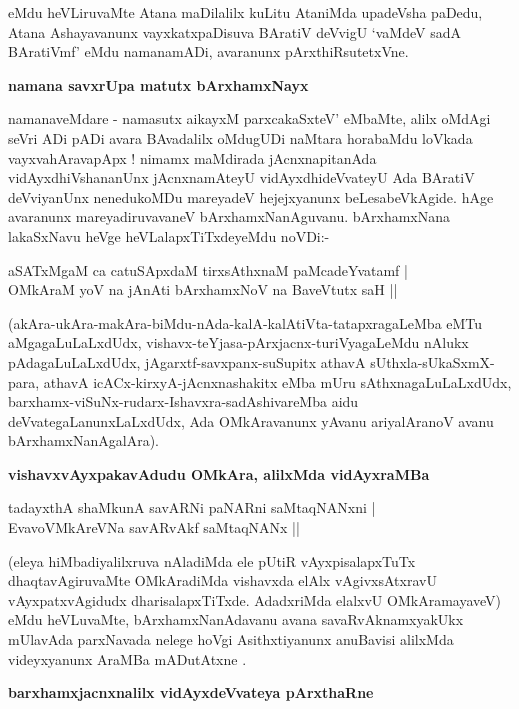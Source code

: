 \noindent
eMdu heVLiruvaMte Atana maDilalilx kuLitu AtaniMda upadeVsha paDedu, Atana Ashayavanunx vayxkatxpaDisuva BAratiV deVvigU `vaMdeV sadA BAratiVmf' eMdu namanamADi, avaranunx pArxthiRsutetxVne.

{\bigskip
\noindent
{\large\bf namana savxrUpa matutx bArxhamxNayx}}\label{page84a}
\medskip

\noindent
namanaveMdare - namasutx aikayxM parxcakaSxteV' eMbaMte, alilx oMdAgi seVri ADi pADi avara BAvadalilx oMdugUDi naMtara horabaMdu loVkada vayxvahAravapApx ! nimamx maMdirada jAcnxnapitanAda vidAyxdhiVshananUnx jAcnxnamAteyU vidAyxdhideVvateyU Ada BAratiV deVviyanUnx nenedukoMDu mareyadeV hejejxyanunx beLesabeVkAgide. hAge avaranunx mareyadiruvavaneV bArxhamxNanAguvanu. bArxhamxNana lakaSxNavu heVge heVLalapxTiTxdeyeMdu noVDi:-

\begin{shloka}
aSATxMgaM ca catuSApxdaM tirxsAthxnaM paMcadeYvatamf |\\\label{84a}
OMkAraM yoV na jAnAti bArxhamxNoV na BaveVtutx saH ||
\end{shloka}

\noindent
(akAra-ukAra-makAra-biMdu-nAda-kalA-kalAtiVta-tatapxragaLeMba eMTu aMgagaLuLaLxdUdx, vishavx-teYjasa-pArxjacnx-turiVyagaLeMdu nAlukx pAdagaLuLaLxdUdx, jAgarxtf-savxpanx-suSupitx athavA sUthxla-sUkaSxmX-para, athavA icACx-kirxyA-jAcnxnashakitx eMba mUru sAthxnagaLuLaLxdUdx, barxhamx-viSuNx-rudarx-Ishavxra-sadAshivareMba aidu deVvategaLanunxLaLxdUdx, Ada OMkAravanunx yAvanu ariyalAranoV avanu bArxhamxNanAgalAra).

{\bigskip
\noindent
{\large\bf vishavxvAyxpakavAdudu OMkAra, alilxMda vidAyxraMBa}}
\medskip

\begin{shloka}
tadayxthA shaMkunA savARNi paNARni saMtaqNANxni |\\\label{84}
EvavoVMkAreVNa savARvAkf saMtaqNANx ||
\end{shloka}

\noindent
(eleya hiMbadiyalilxruva nAladiMda ele pUtiR vAyxpisalapxTuTx dhaqtavAgiruvaMte OMkAradiMda vishavxda elAlx vAgivxsAtxravU vAyxpatxvAgidudx dharisalapxTiTxde. AdadxriMda elalxvU OMkAramayaveV) eMdu heVLuvaMte, bArxhamxNanAdavanu avana savaRvAknamxyakUkx mUlavAda parxNavada nelege hoVgi Asithxtiyanunx anuBavisi alilxMda videyxyanunx AraMBa mADutAtxne .

{\bigskip
\noindent
{\large\bf barxhamxjacnxnalilx vidAyxdeVvateya pArxthaRne}}\label{page85}
\medskip

